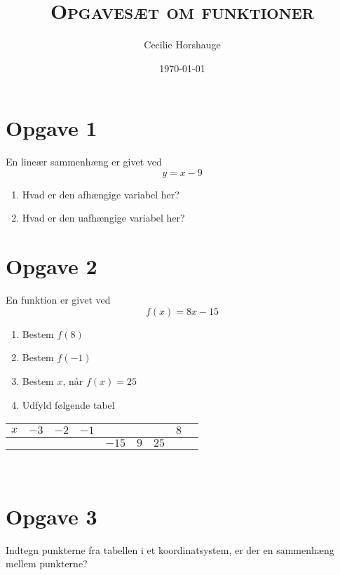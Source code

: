 \documentclass[a4paper, 11pt]{article}
\title{{\large \textsc{Opgavesæt om funktioner}}}
\author{Cecilie Horshauge}
\date{\today}
\begin{document}
\maketitle
\noindent 

\section*{Opgave 1} 
En lineær sammenhæng er givet ved
\[y=x-9\]
\begin{enumerate}[label=\alph*)]
    \item Hvad er den afhængige variabel her?
    \item Hvad er den uafhængige variabel her?
\end{enumerate}

\section*{Opgave 2} 
En funktion er givet ved 
\[f(x)=8x-15\]
\begin{enumerate}[label=\alph*)]
    \item Bestem \(f(8)\)
    \item Bestem \(f(-1)\)
    \item Bestem \(x\), når \(f(x)=25\)
    \item Udfyld følgende tabel
\end{enumerate}
\begin{tabular}{ | m{1 cm} | m{1 cm}| m{1 cm} | m{1 cm} | m{1 cm}| m{1 cm}| m{1 cm}| m{1 cm}| m{1 cm}| }
    \hline
    \(x\) & \(-3\) & \(-2\) & \(-1\) & &  & & \(8\)\\ 
    \hline
    & & & &\(-15\)& \(9\)& \(25\)&\\ 
    \hline
  \end{tabular}\\
\section*{Opgave 3}
Indtegn punkterne fra tabellen i et koordinatsystem, er der en sammenhæng mellem punkterne?
\end{document}
